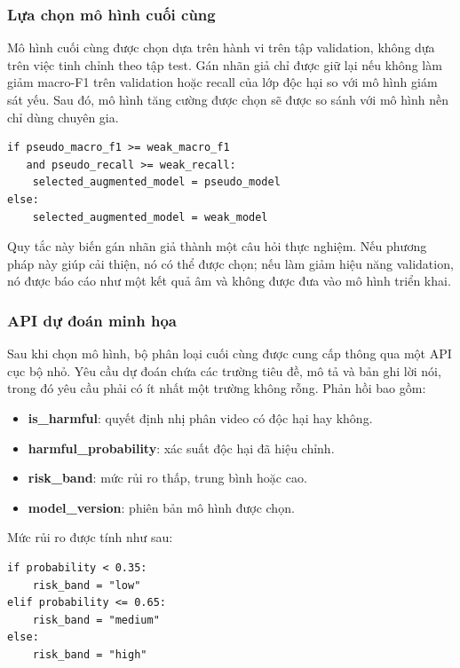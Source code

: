 \subsubsection{Lựa chọn mô hình cuối cùng}

Mô hình cuối cùng được chọn dựa trên hành vi trên tập validation, không dựa trên việc tinh chỉnh theo tập test. Gán nhãn giả chỉ được giữ lại nếu không làm giảm macro-F1 trên validation hoặc recall của lớp độc hại so với mô hình giám sát yếu. Sau đó, mô hình tăng cường được chọn sẽ được so sánh với mô hình nền chỉ dùng chuyên gia.

\begin{verbatim}
if pseudo_macro_f1 >= weak_macro_f1
   and pseudo_recall >= weak_recall:
    selected_augmented_model = pseudo_model
else:
    selected_augmented_model = weak_model
\end{verbatim}

Quy tắc này biến gán nhãn giả thành một câu hỏi thực nghiệm. Nếu phương pháp này giúp cải thiện, nó có thể được chọn; nếu làm giảm hiệu năng validation, nó được báo cáo như một kết quả âm và không được đưa vào mô hình triển khai.

\subsubsection{API dự đoán minh họa}

Sau khi chọn mô hình, bộ phân loại cuối cùng được cung cấp thông qua một API cục bộ nhỏ. Yêu cầu dự đoán chứa các trường tiêu đề, mô tả và bản ghi lời nói, trong đó yêu cầu phải có ít nhất một trường không rỗng. Phản hồi bao gồm:

\begin{itemize}
    \item \textbf{is\_harmful}: quyết định nhị phân video có độc hại hay không.
    \item \textbf{harmful\_probability}: xác suất độc hại đã hiệu chỉnh.
    \item \textbf{risk\_band}: mức rủi ro thấp, trung bình hoặc cao.
    \item \textbf{model\_version}: phiên bản mô hình được chọn.
\end{itemize}

Mức rủi ro được tính như sau:

\begin{verbatim}
if probability < 0.35:
    risk_band = "low"
elif probability <= 0.65:
    risk_band = "medium"
else:
    risk_band = "high"
\end{verbatim}

